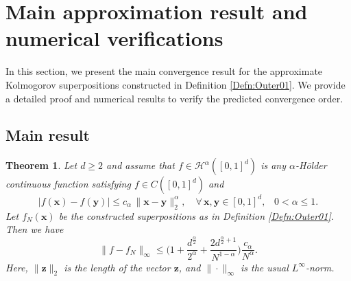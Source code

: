 \documentclass[10pt,reqno,final]{amsart}
\newtheorem{thm}{\bf Theorem}[section]
\newenvironment{theorem}{\begin{thm}} {\end{thm}}
\theoremstyle{remark}
\theoremstyle{definition}
\newcommand{\bs}[1]{\boldsymbol{#1}}
\begin{document}
\section{Main approximation result and numerical verifications}
\label{Sect:MainProof-1}

In this section, we present the main convergence result for the approximate Kolmogorov superpositions constructed in Definition \ref{Defn:Outer01}. We provide a detailed proof and numerical results to verify the predicted convergence order.
\subsection{Main result}
\begin{theorem}\label{MainResult} Let $d\ge 2$ and 
assume that  $f\in {\mathcal H}^\alpha([0,1]^d)$ is any $\alpha$-H\"older continuous function satisfying 
$f\in C([0,1]^d)$ and 
\begin{equation}\label{alpha-cond}
    |f(\bs x)-f(\bs y)|\le c_{\alpha}\, \|\bs x-\bs y\|_2^\alpha, \quad \forall\, \bs x,\bs y \in [0,1]^d,\;\;\; 0<\alpha\le 1.
\end{equation}
 Let $f_N(\bs x)$ be the constructed superpositions as in Definition \ref{Defn:Outer01}. Then we have 
\begin{equation}\label{approximA}
\|f-f_N\|_\infty \le  \Big(1+\frac{d^{\frac{\alpha}{2}}}{2^\alpha} +\frac{2 d^{\frac \alpha 2+1 }}{N^{1-\alpha}}\Big)\frac {c_{\alpha}} {N^{\alpha}}.
\end{equation}
Here, $\|\bs z\|_2$ is the length of the vector $\bs z$, and $\|\cdot\|_\infty$ is the usual $L^\infty$-norm.  
\end{theorem}
\end{document}

